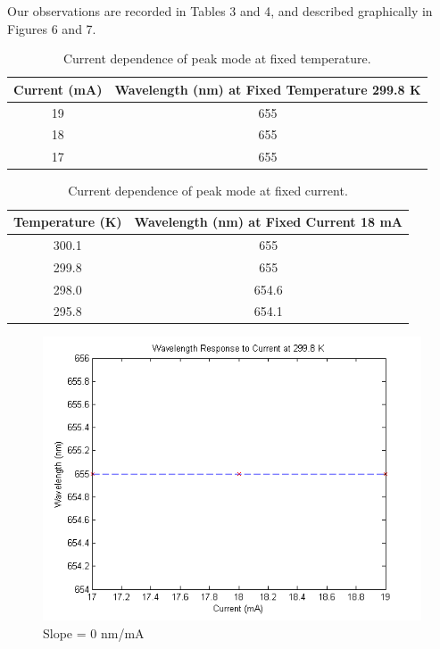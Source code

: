 \documentclass[10pt,a4paper]{article}
\begin{document}
Our observations are recorded in Tables 3 and 4, and described graphically in Figures 6 and 7.
\begin{table}[H]
\centering
\begin{tabular}{|c|c|}
\hline
Current (mA) & Wavelength (nm) at Fixed Temperature 299.8 K\\
\hline
19 & 655 \\
\hline
18 & 655 \\
\hline
17 & 655 \\
\hline
\end{tabular} 
\caption{Current dependence of peak mode at fixed temperature.}
\end{table}
\begin{table}[H]
\centering
\begin{tabular}{|c|c|}
\hline
Temperature (K) & Wavelength (nm) at Fixed Current 18 mA\\
\hline
300.1 & 655 \\
\hline
299.8 & 655 \\
\hline
298.0 & 654.6 \\
\hline
295.8 & 654.1 \\
\hline
\end{tabular} 
\caption{Current dependence of peak mode at fixed current.}
\end{table}
\begin{figure}[H]
\centering
\includegraphics[scale = 0.8]{../Analysis/wavelength-current.png}
\caption{Slope = 0 nm/mA}
\end{figure} 
\end{document}
